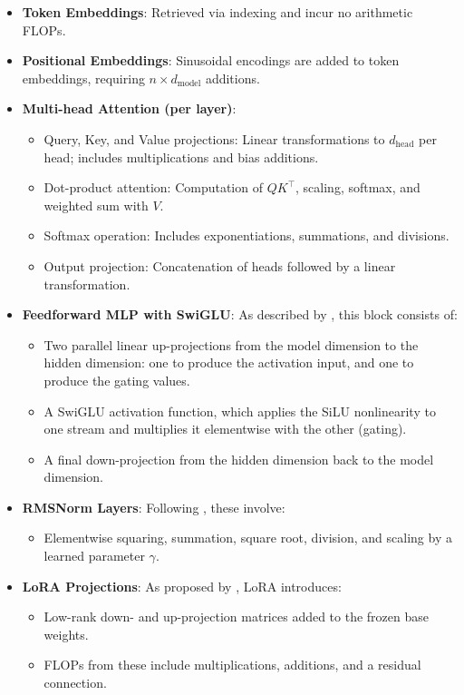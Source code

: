 \documentclass[a4paper,12pt]{article}
\begin{document}
\begin{itemize}
  \item \textbf{Token Embeddings}: Retrieved via indexing and incur no arithmetic FLOPs.
  
  \item \textbf{Positional Embeddings}: Sinusoidal encodings are added to token embeddings, requiring $n \times d_{\text{model}}$ additions.

  \item \textbf{Multi-head Attention (per layer)}:
  \begin{itemize}
    \item Query, Key, and Value projections: Linear transformations to $d_{\text{head}}$ per head; includes multiplications and bias additions.
    \item Dot-product attention: Computation of $QK^\top$, scaling, softmax, and weighted sum with $V$.
    \item Softmax operation: Includes exponentiations, summations, and divisions.
    \item Output projection: Concatenation of heads followed by a linear transformation.
  \end{itemize}

  \item \textbf{Feedforward MLP with SwiGLU}: As described by \citet{shazeer2020glu}, this block consists of:
  \begin{itemize}
    \item Two parallel linear up-projections from the model dimension to the hidden dimension: one to produce the activation input, and one to produce the gating values.
    \item A SwiGLU activation function, which applies the SiLU nonlinearity to one stream and multiplies it elementwise with the other (gating).
    \item A final down-projection from the hidden dimension back to the model dimension.
  \end{itemize}  

  \item \textbf{RMSNorm Layers}: Following \citet{zhang2019root}, these involve:
  \begin{itemize}
    \item Elementwise squaring, summation, square root, division, and scaling by a learned parameter $\gamma$.
  \end{itemize}

  \item \textbf{LoRA Projections}: As proposed by \citet{hu2021lora}, LoRA introduces:
  \begin{itemize}
    \item Low-rank down- and up-projection matrices added to the frozen base weights.
    \item FLOPs from these include multiplications, additions, and a residual connection.
  \end{itemize}


\end{itemize}
\end{document}

